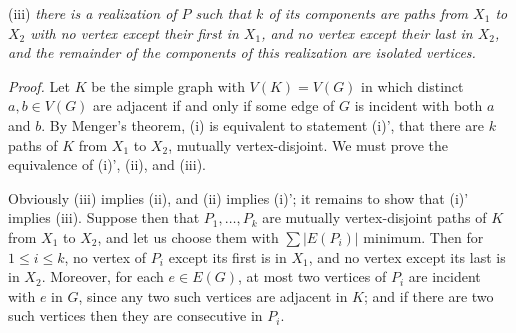 \hspace*{12pt}(iii) \textit{there is a realization of $P$ such that $k$ of its components are paths from $X_1$ to $X_2$ with no vertex except their first in $X_1$, and no vertex except their last in $X_2$, and the remainder of the components of this realization are isolated vertices.}

\textit{Proof.} Let $K$ be the simple graph with $V(K) = V(G)$ in which distinct $a, b \in V(G)$ are adjacent if and only if some edge of $G$ is incident with both $a$ and $b$. By Menger's theorem, (i) is equivalent to statement (i)', that there are $k$ paths of $K$ from $X_1$ to $X_2$, mutually vertex-disjoint. We must prove the equivalence of (i)', (ii), and (iii).

Obviously (iii) implies (ii), and (ii) implies (i)'; it remains to show that (i)' implies (iii). Suppose then that $P_1, \dots, P_k$ are mutually vertex-disjoint paths of $K$ from $X_1$ to $X_2$, and let us choose them with $\sum |E(P_i)|$ minimum. Then for $1 \le i \le k$, no vertex of $P_i$ except its first is in $X_1$, and no vertex except its last is in $X_2$. Moreover, for each $e \in E(G)$, at most two vertices of $P_i$ are incident with $e$ in $G$, since any two such vertices are adjacent in $K$; and if there are two such vertices then they are consecutive in $P_i$.

